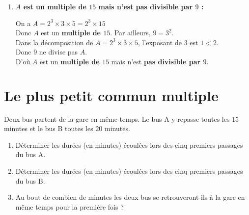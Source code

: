 \documentclass[10pt, a4paper]{article}
\begin{document}
\begin{Solution}[APPLICATION][9]
\begin{enumerate}[leftmargin=*,itemsep=0.5pt]
    \item \textbf{$A$ est un multiple de $15$ mais n'est pas divisible par $9$ :}

    On a $A = 2^3 \times 3 \times 5 = 2^3 \times 15$ \\
    Donc $A$ est un \textbf{multiple de $15$}. Par ailleurs, $9 = 3^2$. \\
    Dans la décomposition de $A = 2^3 \times 3 \times 5$, l'exposant de $3$ est $1 < 2$. \\
    Donc $9$ ne divise pas $A$. \\
    D'où $A$ est un \textbf{multiple de $15$} mais n'est \textbf{pas divisible par $9$}.
\end{enumerate}
\end{Solution}



\section{Le plus petit commun multiple }


\begin{Activite}[][10 min]
Deux bus partent de la gare en même temps.
Le bus A y repasse toutes les $15$ minutes et le bus B toutes les $20$ minutes.

\begin{enumerate}[leftmargin=*,itemsep=0.5pt]
    \item Déterminer les durées (en minutes) écoulées lors des cinq premiers passages du bus A.
    \item Déterminer les durées (en minutes) écoulées lors des cinq premiers passages du bus B.
    \item Au bout de combien de minutes les deux bus se retrouveront-ils à la gare en même temps pour la première fois ?
\end{enumerate}
\end{Activite}
\end{document}

